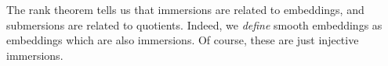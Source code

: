 
The rank theorem tells us that immersions are related to embeddings, and submersions are related to quotients. Indeed, we \emph{define} smooth embeddings as embeddings which are also immersions. Of course, these are just injective immersions.
